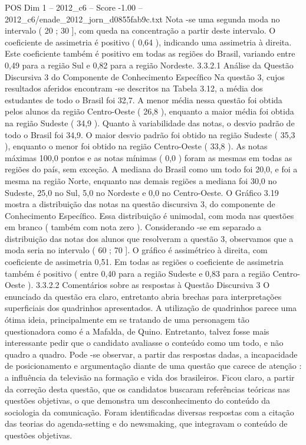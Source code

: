 \begin{textsample}{POS Dim 1 – 2012\_c6 – Score -1.00 – 2012\_c6/enade\_2012\_jorn\_d0855fab9c.txt}
Nota -se uma segunda moda no intervalo ( 20 ; 30 ], com queda na concentração a partir deste intervalo.
O coeficiente de assimetria é positivo ( 0,64 ), indicando uma assimetria à direita.
Este coeficiente também é positivo em todas as regiões do Brasil, variando entre 0,49 para a região Sul e 0,82 para a região Nordeste. 3.3.2.1 Análise da Questão Discursiva 3 do Componente de Conhecimento Específico Na questão 3, cujos resultados aferidos encontram -se descritos na Tabela 3.12, a média dos estudantes de todo o Brasil foi 32,7.
A menor média nessa questão foi obtida pelos alunos da região Centro-Oeste ( 26,8 ), enquanto a maior média foi obtida na região Sudeste ( 34,9 ).
Quanto à variabilidade das notas, o desvio padrão de todo o Brasil foi 34,9.
O maior desvio padrão foi obtido na região Sudeste ( 35,3 ), enquanto o menor foi obtido na região Centro-Oeste ( 33,8 ).
As notas máximas 100,0 pontos e as notas mínimas ( 0,0 ) foram as mesmas em todas as regiões do país, sem exceção.
A mediana do Brasil como um todo foi 20,0, e foi a mesma na região Norte, enquanto nas demais regiões a mediana foi 30,0 no Sudeste, 25,0 no Sul, 5,0 no Nordeste e 0,0 no Centro-Oeste.
O Gráfico 3.19 mostra a distribuição das notas na questão discursiva 3, do componente de Conhecimento Específico.
Essa distribuição é unimodal, com moda nas questões em branco ( também com nota zero ).
Considerando -se em separado a distribuição das notas dos alunos que resolveram a questão 3, observamos que a moda seria no intervalo ( 60 ; 70 ].
O gráfico é assimétrico à direita, com coeficiente de assimetria 0,51.
Em todas as regiões o coeficiente de assimetria também é positivo ( entre 0,40 para a região Sudeste e 0,83 para a região Centro-Oeste ). 3.3.2.2 Comentários sobre as respostas à Questão Discursiva 3 O enunciado da questão era claro, entretanto abria brechas para interpretações superficiais dos quadrinhos apresentados.
A utilização de quadrinhos parece uma ótima ideia, principalmente em se tratando de uma personagem tão questionadora como é a Mafalda, de Quino.
Entretanto, talvez fosse mais interessante pedir que o candidato avaliasse o conteúdo como um todo, e não quadro a quadro.
Pode -se observar, a partir das respostas dadas, a incapacidade de posicionamento e argumentação diante de uma questão que carece de atenção : a influência da televisão na formação e vida dos brasileiros.
Ficou claro, a partir da correção desta questão, que os candidatos buscaram referências teóricas nas questões objetivas, o que demonstra um desconhecimento do conteúdo da sociologia da comunicação.
Foram identificadas diversas respostas com a citação das teorias do agenda-setting e do newsmaking, que integravam o conteúdo de questões objetivas.

\end{textsample}
